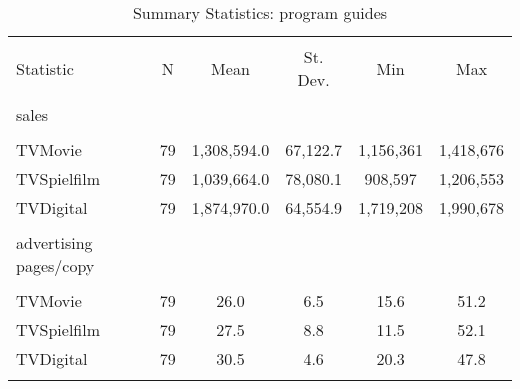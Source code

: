 \begin{table}[!htbp] \centering 
  \caption{Summary Statistics: program guides} 
	\label{tab_tv}
\begin{tabular}{@{\extracolsep{5pt}}lccccc} 
\\[-1.8ex]\hline 
\hline \\[-1.8ex] 
Statistic & \multicolumn{1}{c}{N} & \multicolumn{1}{c}{Mean} & \multicolumn{1}{c}{St. Dev.} & \multicolumn{1}{c}{Min} & \multicolumn{1}{c}{Max} \\ 
\hline \\[-1.8ex] 
sales \\
\hline \\[-1.8ex]
TVMovie & 79 & 1,308,594.0 & 67,122.7 & 1,156,361 & 1,418,676 \\ 
TVSpielfilm & 79 & 1,039,664.0 & 78,080.1 & 908,597 & 1,206,553 \\ 
TVDigital & 79 & 1,874,970.0 & 64,554.9 & 1,719,208 & 1,990,678 \\ 
\hline \\[-1.8ex] 
advertising pages/copy \\
\hline \\[-1.8ex]
TVMovie & 79 & 26.0 & 6.5 & 15.6 & 51.2 \\ 
TVSpielfilm & 79 & 27.5 & 8.8 & 11.5 & 52.1 \\ 
TVDigital & 79 & 30.5 & 4.6 & 20.3 & 47.8 \\ 
\hline \\[-1.8ex] 
\end{tabular}  
\end{table} 
